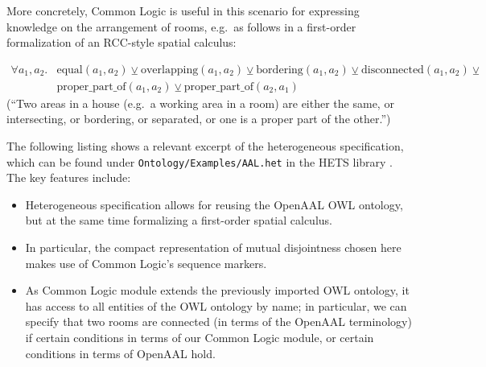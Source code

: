 \documentclass{article}
\newcommand{\normalTEXTSC}[2]{{#1\scriptsize#2}}
\newcommand     {\Hets}{\normalTEXTSC{H}{ETS}\xspace}
\begin{document}
More concretely, Common Logic is useful in this scenario for expressing knowledge on the arrangement of rooms, e.g.\ as follows in a first-order formalization of an RCC-style spatial calculus:

\begin{align*}
  \forall a_1, a_2 .&\mathrm{equal}(a_1, a_2) \veebar \mathrm{overlapping}(a_1, a_2) \veebar \mathrm{bordering}(a_1, a_2) \veebar \mathrm{disconnected}(a_1, a_2) \veebar\\
  &\mathrm{proper\_part\_of}(a_1, a_2) \veebar \mathrm{proper\_part\_of}(a_2, a_1)
\end{align*}
(“Two areas in a house (e.g.\ a working area in a room) are either the same, or intersecting, or bordering, or separated, or one is a proper part of the other.”)

The following listing shows a relevant excerpt of the heterogeneous specification, which can be found 
under \texttt{Ontology/Examples/AAL.het} in the \Hets library \cite{hets-library:URL}.  The key features include:

\begin{itemize}
\item Heterogeneous specification allows for reusing the OpenAAL OWL ontology, but at the same time formalizing a first-order spatial calculus.
\item In particular, the compact representation of mutual disjointness chosen here makes use of Common Logic's sequence markers.
\item As Common Logic module extends the previously imported OWL ontology, it has access to all entities of the OWL ontology by name; in particular, we can specify that two rooms are connected (in terms of the OpenAAL terminology) if certain conditions in terms of our Common Logic module, or certain conditions in terms of OpenAAL hold.
\end{itemize}
\end{document}
